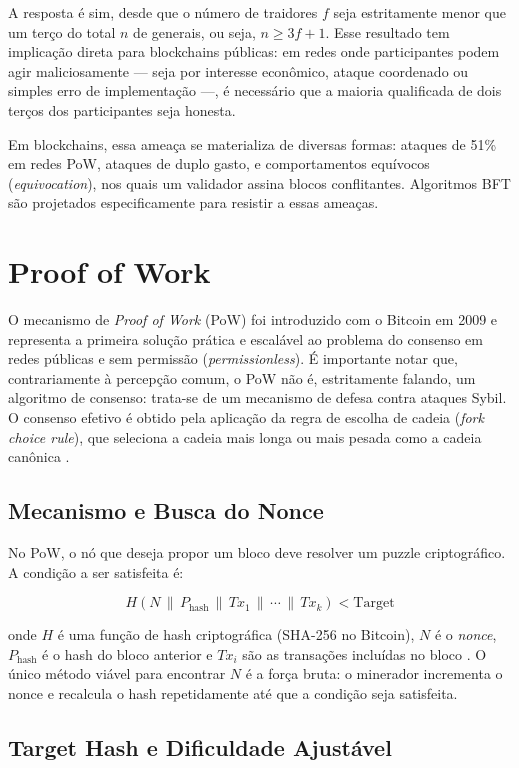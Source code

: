 \documentclass[12pt,a4paper]{report}
\begin{document}
A resposta é sim, desde que o número de traidores $f$ seja estritamente menor que um terço do total $n$ de generais, ou seja, $n \geq 3f + 1$. Esse resultado tem implicação direta para blockchains públicas: em redes onde participantes podem agir maliciosamente --- seja por interesse econômico, ataque coordenado ou simples erro de implementação ---, é necessário que a maioria qualificada de dois terços dos participantes seja honesta.

Em blockchains, essa ameaça se materializa de diversas formas: ataques de 51\% em redes PoW, ataques de duplo gasto, e comportamentos equívocos (\textit{equivocation}), nos quais um validador assina blocos conflitantes. Algoritmos BFT são projetados especificamente para resistir a essas ameaças.

\section{Proof of Work}

O mecanismo de \textit{Proof of Work} (PoW) foi introduzido com o Bitcoin em 2009 e representa a primeira solução prática e escalável ao problema do consenso em redes públicas e sem permissão (\textit{permissionless}). É importante notar que, contrariamente à percepção comum, o PoW não é, estritamente falando, um algoritmo de consenso: trata-se de um mecanismo de defesa contra ataques Sybil. O consenso efetivo é obtido pela aplicação da regra de escolha de cadeia (\textit{fork choice rule}), que seleciona a cadeia mais longa ou mais pesada como a cadeia canônica \cite{Bashir2023}.

\subsection{Mecanismo e Busca do Nonce}

No PoW, o nó que deseja propor um bloco deve resolver um puzzle criptográfico. A condição a ser satisfeita é:

\[
H(N \,\|\, P_{\text{hash}} \,\|\, Tx_1 \,\|\, \cdots \,\|\, Tx_k) < \text{Target}
\]

onde $H$ é uma função de hash criptográfica (SHA-256 no Bitcoin), $N$ é o \textit{nonce}, $P_{\text{hash}}$ é o hash do bloco anterior e $Tx_i$ são as transações incluídas no bloco \cite{Bashir2023}. O único método viável para encontrar $N$ é a força bruta: o minerador incrementa o nonce e recalcula o hash repetidamente até que a condição seja satisfeita.

\subsection{Target Hash e Dificuldade Ajustável}
\end{document}
